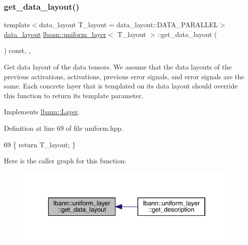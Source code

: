 \subsubsection{\texorpdfstring{get\+\_\+data\+\_\+layout()}{get\_data\_layout()}}
{\footnotesize\ttfamily template$<$data\+\_\+layout T\+\_\+layout = data\+\_\+layout\+::\+D\+A\+T\+A\+\_\+\+P\+A\+R\+A\+L\+L\+EL$>$ \\
\hyperlink{base_8hpp_a786677cbfb3f5677b4d84f3056eb08db}{data\+\_\+layout} \hyperlink{classlbann_1_1uniform__layer}{lbann\+::uniform\+\_\+layer}$<$ T\+\_\+layout $>$\+::get\+\_\+data\+\_\+layout (\begin{DoxyParamCaption}{ }\end{DoxyParamCaption}) const\hspace{0.3cm}{\ttfamily [inline]}, {\ttfamily [override]}, {\ttfamily [virtual]}}

Get data layout of the data tensors. We assume that the data layouts of the previous activations, activations, previous error signals, and error signals are the same. Each concrete layer that is templated on its data layout should override this function to return its template parameter. 

Implements \hyperlink{classlbann_1_1Layer_a5dfb66e81fc085997402a5e2241316bd}{lbann\+::\+Layer}.



Definition at line 69 of file uniform.\+hpp.


\begin{DoxyCode}
69 \{ \textcolor{keywordflow}{return} T\_layout; \}
\end{DoxyCode}
Here is the caller graph for this function\+:\nopagebreak
\begin{figure}[H]
\begin{center}
\leavevmode
\includegraphics[width=329pt]{classlbann_1_1uniform__layer_adacae6beb724aa10b7f625b1418e9015_icgraph}
\end{center}
\end{figure}
\mbox{\label{classlbann_1_1uniform__layer_a41b8f6ed59de66dda1f95a6b4ee4762f}} 

